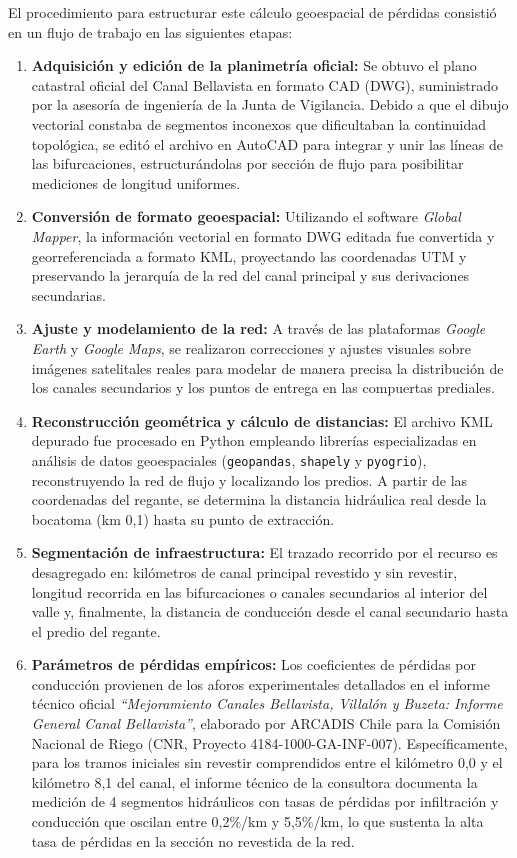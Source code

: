 \documentclass[12pt]{report}
\begin{document}
El procedimiento para estructurar este cálculo geoespacial de pérdidas consistió en un flujo de trabajo en las siguientes etapas:
\begin{enumerate}
    \item \textbf{Adquisición y edición de la planimetría oficial:} Se obtuvo el plano catastral oficial del Canal Bellavista en formato CAD (DWG), suministrado por la asesoría de ingeniería de la Junta de Vigilancia. Debido a que el dibujo vectorial constaba de segmentos inconexos que dificultaban la continuidad topológica, se editó el archivo en AutoCAD para integrar y unir las líneas de las bifurcaciones, estructurándolas por sección de flujo para posibilitar mediciones de longitud uniformes.
    \item \textbf{Conversión de formato geoespacial:} Utilizando el software \textit{Global Mapper}, la información vectorial en formato DWG editada fue convertida y georreferenciada a formato KML, proyectando las coordenadas UTM y preservando la jerarquía de la red del canal principal y sus derivaciones secundarias.
    \item \textbf{Ajuste y modelamiento de la red:} A través de las plataformas \textit{Google Earth} y \textit{Google Maps}, se realizaron correcciones y ajustes visuales sobre imágenes satelitales reales para modelar de manera precisa la distribución de los canales secundarios y los puntos de entrega en las compuertas prediales.
    \item \textbf{Reconstrucción geométrica y cálculo de distancias:} El archivo KML depurado fue procesado en Python empleando librerías especializadas en análisis de datos geoespaciales (\texttt{geopandas}, \texttt{shapely} y \texttt{pyogrio}), reconstruyendo la red de flujo y localizando los predios. A partir de las coordenadas del regante, se determina la distancia hidráulica real desde la bocatoma (km 0,1) hasta su punto de extracción.
    \item \textbf{Segmentación de infraestructura:} El trazado recorrido por el recurso es desagregado en: kilómetros de canal principal revestido y sin revestir, longitud recorrida en las bifurcaciones o canales secundarios al interior del valle y, finalmente, la distancia de conducción desde el canal secundario hasta el predio del regante.
    \item \textbf{Parámetros de pérdidas empíricos:} Los coeficientes de pérdidas por conducción provienen de los aforos experimentales detallados en el informe técnico oficial \textit{``Mejoramiento Canales Bellavista, Villalón y Buzeta: Informe General Canal Bellavista''}, elaborado por ARCADIS Chile para la Comisión Nacional de Riego (CNR, Proyecto 4184-1000-GA-INF-007). Específicamente, para los tramos iniciales sin revestir comprendidos entre el kilómetro 0,0 y el kilómetro 8,1 del canal, el informe técnico de la consultora documenta la medición de 4 segmentos hidráulicos con tasas de pérdidas por infiltración y conducción que oscilan entre 0,2\%/km y 5,5\%/km, lo que sustenta la alta tasa de pérdidas en la sección no revestida de la red.
\end{enumerate}
\end{document}
